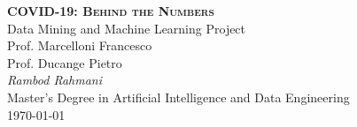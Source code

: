 \documentclass[11pt,a4paper]{article}
\begin{document}
\begin{center}
	\huge{\bfseries{\scshape{COVID-19: Behind the Numbers}}}\\
	\vspace{1.0cm}
	\large{Data Mining and Machine Learning Project}\\
	\vspace{0.2cm}
	\large{Prof. Marcelloni Francesco}\\
	\vspace{0.2cm}
	\large{Prof. Ducange Pietro}\\
	\vspace{1.0cm}
	\large\textit{Rambod Rahmani}\\
	\vspace{0.2cm}
	\scriptsize{Master's Degree in Artificial Intelligence and
	Data Engineering}\\
	\vspace{1.0cm}
	\normalsize{\today}
\end{center}

\tableofcontents
\newpage

\end{document}
